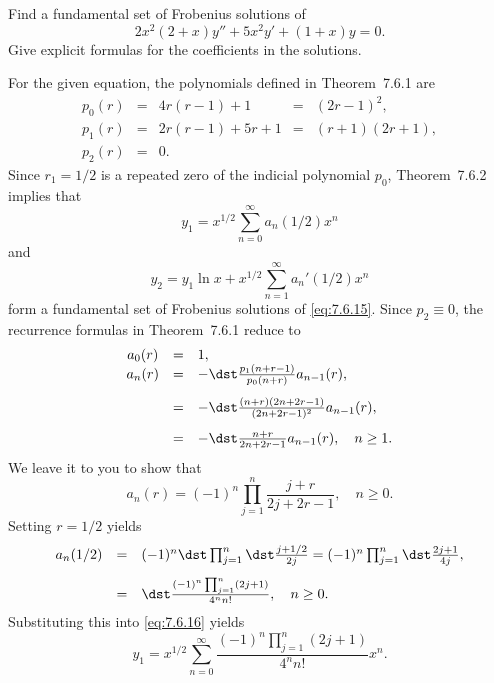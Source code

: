 \setcounter{example}{1}
\setcounter{equation}{14}
\begin{example}
  \label{example:7.6.2} \rm Find a fundamental set of Frobenius solutions of
  \begin{equation}
    \label{eq:7.6.15}2x^{2}(2+x)y''+5x^{2}y'+(1+x)y=0.
  \end{equation}
  Give explicit formulas for the coefficients in the solutions.
\end{example}
\setcounter{equation}{15}
\begin{examplesolution}
\solution For the given equation, the polynomials defined in Theorem~7.6.1 are
\[
  \begin{array}{ccccc}
    p_{0}(r) & = & 4r(r-1)+1    & = & (2r-1)^{2},  \\[5pt]
    p_{1}(r) & = & 2r(r-1)+5r+1 & = & (r+1)(2r+1), \\[5pt]
    p_{2}(r) & = & 0.
  \end{array}
\]
Since $r_{1}=1/2$ is a repeated zero of the indicial polynomial $p_{0}$, Theorem~7.6.2
implies that
\begin{equation}
  \label{eq:7.6.16}y_{1}=x^{1/2}\sum_{n=0}^{\infty}a_{n}(1/2)x^{n}
\end{equation}
and
\begin{equation}
  \label{eq:7.6.17}y_{2}=y_{1}\ln x+x^{1/2}\sum_{n=1}^{\infty}a_{n}'(1/2)x^{n}
\end{equation}
form a fundamental set of Frobenius solutions of \eqref{eq:7.6.15}. Since $p_{2}\equiv0$, the
recurrence formulas in Theorem~7.6.1 reduce to
\[
  \begin{array}{ccl}
    a_{0}(r) & = & 1,                                                   \\
    a_{n}(r) & = & -\dst\frac{p_{1}(n+r-1)}{p_{0}(n+r)}a_{n-1}(r),      \\[10pt]
             & = & -\dst\frac{(n+r)(2n+2r-1)}{(2n+2r-1)^{2}}a_{n-1}(r), \\[10pt]
             & = & -\dst\frac{n+r}{2n+2r-1}a_{n-1}(r),\quad n\ge1.
  \end{array}
\]
We leave it to you to show that
\begin{equation}
  \label{eq:7.6.18}a_{n}(r)=(-1)^{n}\prod_{j=1}^{n}\frac{j+r}{2j+2r-1},\quad n\ge0.
\end{equation}
Setting $r=1/2$ yields
\begin{equation}
  \label{eq:7.6.19}
  \begin{array}{ccl}
    a_{n}(1/2) & = & (-1)^{n}\dst\prod_{j=1}^{n}\dst\frac{j+1/2}{2j}= (-1)^{n}\prod_{j=1}^{n}\dst\frac{2j+1}{4j}, \\[10pt]
               & = & \dst\frac{(-1)^{n}\prod_{j=1}^{n}(2j+1)}{4^{n}n!},\quad n\ge0.
  \end{array}
\end{equation}
Substituting this into \eqref{eq:7.6.16} yields
\[
  y_{1}=x^{1/2}\sum_{n=0}^{\infty}\frac{(-1)^{n}\prod_{j=1}^{n}(2j+1)}{4^{n}n!}x^{n}.
\]


\end{examplesolution}
